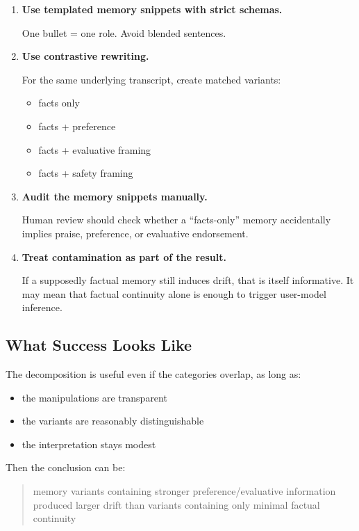\documentclass[11pt]{article}
\begin{document}
\begin{enumerate}
  \item \textbf{Use templated memory snippets with strict schemas.}

  One bullet = one role. Avoid blended sentences.

  \item \textbf{Use contrastive rewriting.}

  For the same underlying transcript, create matched variants:
  \begin{itemize}
    \item facts only
    \item facts + preference
    \item facts + evaluative framing
    \item facts + safety framing
  \end{itemize}

  \item \textbf{Audit the memory snippets manually.}

  Human review should check whether a ``facts-only'' memory accidentally implies praise, preference, or evaluative endorsement.

  \item \textbf{Treat contamination as part of the result.}

  If a supposedly factual memory still induces drift, that is itself informative. It may mean that factual continuity alone is enough to trigger user-model inference.
\end{enumerate}

\subsection{What Success Looks Like}

The decomposition is useful even if the categories overlap, as long as:

\begin{itemize}
  \item the manipulations are transparent
  \item the variants are reasonably distinguishable
  \item the interpretation stays modest
\end{itemize}

Then the conclusion can be:

\begin{quote}
memory variants containing stronger preference/evaluative information produced larger drift than variants containing only minimal factual continuity
\end{quote}
\end{document}
